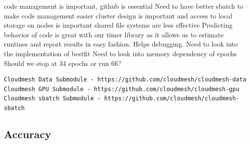 \documentclass[utf8]{FrontiersinVancouver} %
\newcommand{\TODO}[1]{\todo[inline]{#1}}
\begin{document}
code management is important, github is essential
Need to have better sbatch to make code management easier
cluster design is important and access to local storage on nodes is important
shared file systems are less effective 
Predicting behavior of code is great with our timer library as it allows us to estimate runtines and report results in easy fashion. Helps debugging.
Need to look into the implementation of bestfit 
Need to look into memory dependency of epochs
Should we stop at 34 epochs or run 66?

\TODO{add k80 elsewher}

{\footnotesize
\begin{verbatim}
Cloudmesh Data Submodule - https://github.com/cloudmesh/cloudmesh-data
Cloudmesh GPU Submodule - https://github.com/cloudmesh/cloudmesh-gpu
Cloudmesh sbatch Submodule - https://github.com/cloudmesh/cloudmesh-sbatch 
\end{verbatim}
}

\subsection{Accuracy}
\label{sec:perf-accuracy}


\end{document}
